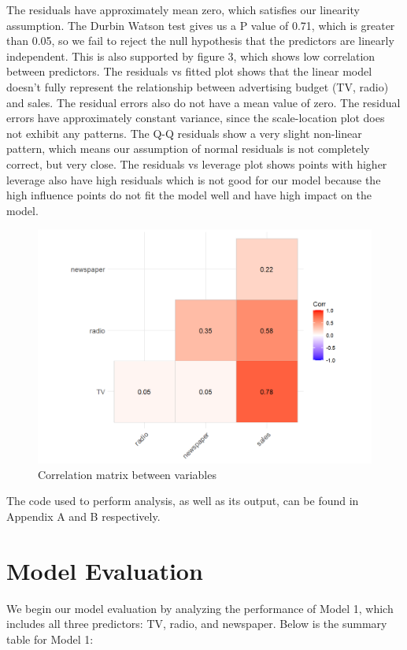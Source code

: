 \documentclass{article}
\begin{document}
The residuals have approximately mean zero, which satisfies our linearity assumption. The Durbin Watson test gives us a P value of 0.71, which is greater than 0.05, so we fail to reject the null hypothesis that the predictors are linearly independent. This is also supported by figure 3, which shows low correlation between predictors. The residuals vs fitted plot shows that the linear model doesn’t fully represent the relationship between advertising budget (TV, radio) and sales. The residual errors also do not have a mean value of zero. The residual errors have approximately constant variance, since the scale-location plot does not exhibit any patterns.  The Q-Q residuals show a very slight non-linear pattern, which means our assumption of normal residuals is not completely correct, but very close. The residuals vs leverage plot shows points with higher leverage also have high residuals which is not good for our model because the high influence points do not fit the model well and have high impact on the model. 

\begin{figure}[h!]
    \centering
    \includegraphics[width=0.7\linewidth]{correlation.png}
    \caption{Correlation matrix between variables}
    \label{fig:enter-label}
\end{figure}

The code used to perform analysis, as well as its output, can be found in Appendix A and B respectively.


\section{Model Evaluation}

We begin our model evaluation by analyzing the performance of Model 1, which includes all three predictors: TV, radio, and newspaper. Below is the summary table for Model 1:
\end{document}
